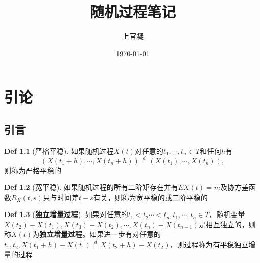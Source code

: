 \documentclass[]{report}
\title{随机过程笔记}
\author{上官凝}
\date{\today}
\begin{document}
\theoremstyle{definition} \newtheorem{theorem}{Thm}[section] %
\theoremstyle{definition} \newtheorem{definition}{Def}[section] %
\theoremstyle{plain} \newtheorem{lemma}{lemma}[section] %

	\maketitle
	\newpage

	\tableofcontents
	\newpage

	\chapter{引论}
	\section{引言}
		\begin{definition}[严格平稳\label{严平稳}]
			如果随机过程$X(t)$对任意的$t_1,\cdots,t_n\in T$和任何$h$有
			\[(X(t_1+h),\cdots,X(t_n+h))\stackrel{d}{=}(X(t_1),\cdots,X(t_n)),\]则称为严格平稳的
		\end{definition}
		\begin{definition}[宽平稳\label{宽平稳}]
			如果随机过程的所有二阶矩存在并有$EX(t)=m$及协方差函数$R_X(t,s)$只与时间差$t-s$有关，则称为宽平稳的或二阶平稳的
		\end{definition}
		\begin{definition}[\textbf{独立增量过程}\label{独立增量过程}]
			如果对任意的$t_1<t_2\cdots<t_n,t_1,\cdots,t_n\in T$，随机变量$X(t_2)-X(t_1),X(t_3)-X(t_2),\cdots,X(t_n)-X(t_{n-1})$是相互独立的，则称$X(t)$为\textbf{独立增量过程}。如果进一步有对任意的$t_1,t_2,X(t_1+h)-X(t_1)\stackrel{d}{=}X(t_2+h)-X(t_2)$，则过程称为有平稳独立增量的过程
		\end{definition}
\end{document}
